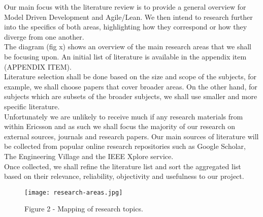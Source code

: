 \documentclass[ProjectPlan_innit.tex]{subfiles}
\begin{document}
Our main focus with the literature review is to provide a general overview for Model Driven Development and Agile/Lean. We then intend to research further into the specifics of both areas, highlighting how they correspond or how they diverge from one another. 
\hspace{0pt} \\

The diagram (fig x) shows an overview of the main research areas that we shall be focusing upon. An initial list of literature is available in the appendix item (APPENDIX ITEM).
\hspace{0pt} \\

Literature selection shall be done based on the size and scope of the subjects, for example, we shall choose papers that cover broader areas. On the other hand, for subjects which are subsets of the broader subjects, we shall use smaller and more specific literature.
\hspace{0pt} \\

Unfortunately we are unlikely to receive much if any research materials from within Ericsson and as such we shall focus the majority of our research on external sources, journals and research papers. Our main sources of literature will be collected from popular online research repositories such as Google Scholar, The Engineering Village and the IEEE Xplore service. 
\hspace{0pt} \\

Once collected, we shall refine the literature list and sort the aggregated list based on their relevance, reliability, objectivity and usefulness to our project. 
\hspace{0pt} \\

\begin{figure*}[H!]
  \texttt{[image: research-areas.jpg]}
  \caption{Figure 2 - Mapping of research topics.}
  \label{BBB}
\end{figure*}
\end{document}
